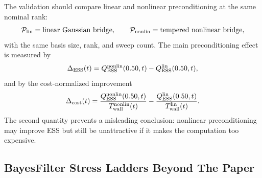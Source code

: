 \documentclass[11pt]{article}
\numberwithin{equation}{section}
\begin{document}
The validation should compare linear and nonlinear preconditioning at the same
nominal rank:
\begin{equation}
    \mathcal P_{\rm lin}
    =
    \text{linear Gaussian bridge},
    \qquad
    \mathcal P_{\rm nonlin}
    =
    \text{tempered nonlinear bridge},
    \label{eq:p27-pp6}
\end{equation}
with the same basis size, rank, and sweep count.  The main preconditioning
effect is measured by
\begin{equation}
    \Delta_{\rm ESS}(t)
    =
    Q_{\rm ESS}^{\rm nonlin}(0.50,t)
    -
    Q_{\rm ESS}^{\rm lin}(0.50,t),
    \label{eq:p27-pp7}
\end{equation}
and by the cost-normalized improvement
\begin{equation}
    \Delta_{\rm cost}(t)
    =
    \frac{Q_{\rm ESS}^{\rm nonlin}(0.50,t)}
    {T_{\rm wall}^{\rm nonlin}(t)}
    -
    \frac{Q_{\rm ESS}^{\rm lin}(0.50,t)}
    {T_{\rm wall}^{\rm lin}(t)}.
    \label{eq:p27-pp8}
\end{equation}
The second quantity prevents a misleading conclusion: nonlinear
preconditioning may improve ESS but still be unattractive if it makes the
computation too expensive.

\subsection{BayesFilter Stress Ladders Beyond The Paper}
\end{document}
